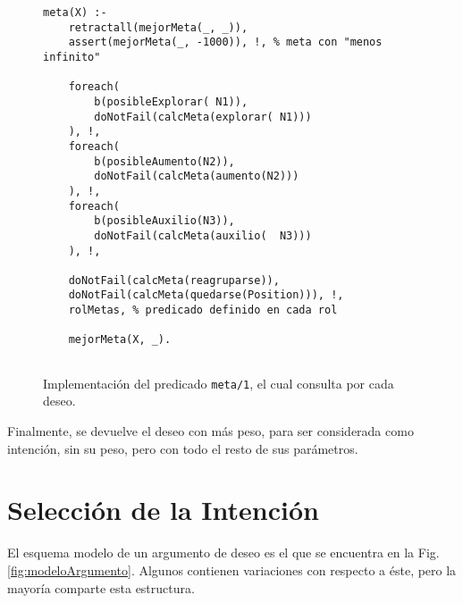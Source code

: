 \documentclass[oneside]{book}
\begin{document}
\begin{figure}
\begin{verbatim}
meta(X) :- 
    retractall(mejorMeta(_, _)),
    assert(mejorMeta(_, -1000)), !, % meta con "menos infinito"
    
    foreach(
        b(posibleExplorar( N1)), 
        doNotFail(calcMeta(explorar( N1)))
    ), !,
    foreach(
        b(posibleAumento(N2)), 
        doNotFail(calcMeta(aumento(N2)))
    ), !, 
    foreach(
        b(posibleAuxilio(N3)), 
        doNotFail(calcMeta(auxilio(  N3)))
    ), !,
    
	doNotFail(calcMeta(reagruparse)),
    doNotFail(calcMeta(quedarse(Position))), !,
    rolMetas, % predicado definido en cada rol
    
    mejorMeta(X, _).
    
\end{verbatim}
\caption{Implementación del predicado \texttt{meta/1}, el cual consulta por cada 
deseo.}
\label{fig:interfazProlog}
\end{figure}

Finalmente, se devuelve el deseo con más peso, para ser considerada como intención,
sin su peso, pero con todo el resto de sus parámetros. %


\section{Selección de la Intención}

El esquema modelo de un argumento de deseo es el que se encuentra en la Fig. 
\ref{fig:modeloArgumento}. Algunos contienen variaciones con respecto a éste, pero
la mayoría comparte esta estructura.
\end{document}
